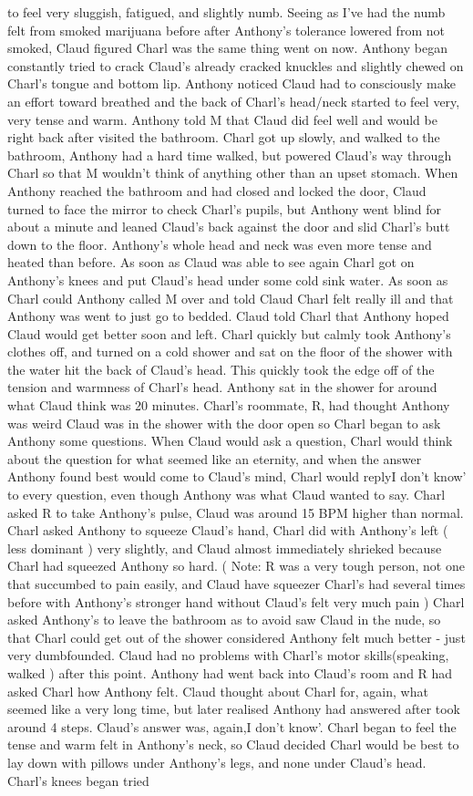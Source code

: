 \documentclass[12pt]{book}
\begin{document}
to feel very sluggish, fatigued, and slightly numb. Seeing as I've had the numb felt from smoked marijuana before after Anthony's tolerance lowered from not smoked, Claud figured Charl was the same thing went on now. Anthony began constantly tried to crack Claud's already cracked knuckles and slightly chewed on Charl's tongue and bottom lip. Anthony noticed Claud had to consciously make an effort toward breathed and the back of Charl's head/neck started to feel very, very tense and warm. Anthony told M that Claud did feel well and would be right back after visited the bathroom. Charl got up slowly, and walked to the bathroom, Anthony had a hard time walked, but powered Claud's way through Charl so that M wouldn't think of anything other than an upset stomach. When Anthony reached the bathroom and had closed and locked the door, Claud turned to face the mirror to check Charl's pupils, but Anthony went blind for about a minute and leaned Claud's back against the door and slid Charl's butt down to the floor. Anthony's whole head and neck was even more tense and heated than before. As soon as Claud was able to see again Charl got on Anthony's knees and put Claud's head under some cold sink water. As soon as Charl could Anthony called M over and told Claud Charl felt really ill and that Anthony was went to just go to bedded. Claud told Charl that Anthony hoped Claud would get better soon and left. Charl quickly but calmly took Anthony's clothes off, and turned on a cold shower and sat on the floor of the shower with the water hit the back of Claud's head. This quickly took the edge off of the tension and warmness of Charl's head. Anthony sat in the shower for around what Claud think was 20 minutes. Charl's roommate, R, had thought Anthony was weird Claud was in the shower with the door open so Charl began to ask Anthony some questions. When Claud would ask a question, Charl would think about the question for what seemed like an eternity, and when the answer Anthony found best would come to Claud's mind, Charl would replyI don't know' to every question, even though Anthony was what Claud wanted to say. Charl asked R to take Anthony's pulse, Claud was around 15 BPM higher than normal. Charl asked Anthony to squeeze Claud's hand, Charl did with Anthony's left ( less dominant ) very slightly, and Claud almost immediately shrieked because Charl had squeezed Anthony so hard. ( Note: R was a very tough person, not one that succumbed to pain easily, and Claud have squeezer Charl's had several times before with Anthony's stronger hand without Claud's felt very much pain ) Charl asked Anthony's to leave the bathroom as to avoid saw Claud in the nude, so that Charl could get out of the shower considered Anthony felt much better - just very dumbfounded. Claud had no problems with Charl's motor skills(speaking, walked ) after this point. Anthony had went back into Claud's room and R had asked Charl how Anthony felt. Claud thought about Charl for, again, what seemed like a very long time, but later realised Anthony had answered after took around 4 steps. Claud's answer was, again,I don't know'. Charl began to feel the tense and warm felt in Anthony's neck, so Claud decided Charl would be best to lay down with pillows under Anthony's legs, and none under Claud's head. Charl's knees began tried 
\end{document}
